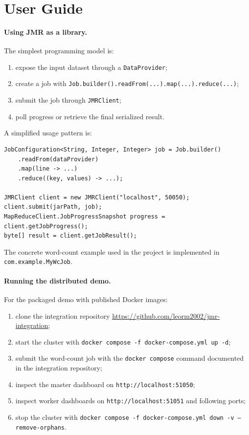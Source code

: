 \documentclass{scrartcl}
\begin{document}
\section{User Guide}\label{user-guide}

\paragraph{Using JMR as a library.}
The simplest programming model is:
%
\begin{enumerate}
    \item expose the input dataset through a \texttt{DataProvider};
    \item create a job with \texttt{Job.builder().readFrom(...).map(...).reduce(...)};
    \item submit the job through \texttt{JMRClient};
    \item poll progress or retrieve the final serialized result.
\end{enumerate}

A simplified usage pattern is:
%
\begin{verbatim}
JobConfiguration<String, Integer, Integer> job = Job.builder()
    .readFrom(dataProvider)
    .map(line -> ...)
    .reduce((key, values) -> ...);

JMRClient client = new JMRClient("localhost", 50050);
client.submit(jarPath, job);
MapReduceClient.JobProgressSnapshot progress = client.getJobProgress();
byte[] result = client.getJobResult();
\end{verbatim}

The concrete word-count example used in the project is implemented in \texttt{com.example.MyWcJob}.

\paragraph{Running the distributed demo.}
For the packaged demo with published Docker images:
%
\begin{enumerate}
    \item clone the integration repository \url{https://github.com/leorm2002/jmr-integration};
    \item start the cluster with \texttt{docker compose -f docker-compose.yml up -d};
    \item submit the word-count job with the \texttt{docker compose} command documented in the integration repository;
    \item inspect the master dashboard on \texttt{http://localhost:51050};
    \item inspect worker dashboards on \texttt{http://localhost:51051} and following ports;
    \item stop the cluster with \texttt{docker compose -f docker-compose.yml down -v --remove-orphans}.
\end{enumerate}
\end{document}
